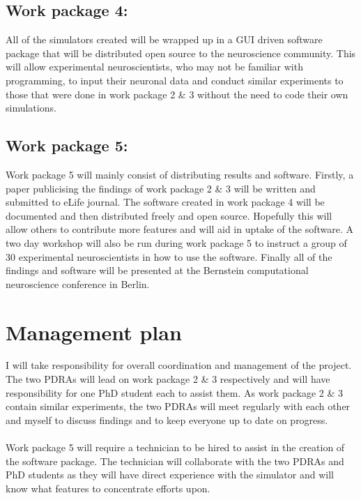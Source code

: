 \documentclass{epsrc}
\begin{document}
\subsection{Work package 4:}
\noindent	
All of the simulators created will be wrapped up in a GUI driven software package that will be distributed open source to the neuroscience community. This will allow experimental neuroscientists, who may not be familiar with programming, to input their neuronal data and conduct similar experiments to those that were done in work package 2 \& 3 without the need to code their own simulations.
\\
\subsection{Work package 5:}
\noindent
Work package 5 will mainly consist of distributing results and software. Firstly, a paper publicising the findings of work package 2 \& 3 will be written and submitted to eLife journal. The software created in work package 4 will be documented and then distributed freely and open source. Hopefully this will allow others to contribute more features and will aid in uptake of the software. A two day workshop will also be run during work package 5 to instruct a group of 30 experimental neuroscientists in how to use the software. Finally all of the findings and software will be presented at the Bernstein computational neuroscience conference in Berlin. 
\\
\section{Management plan}
\noindent
I will take responsibility for overall coordination and management of the project. The two PDRAs will lead on work package 2 \& 3 respectively and will have responsibility for one PhD student each to assist them. As work package 2 \& 3 contain similar experiments, the two PDRAs will meet regularly with each other and myself to discuss findings and to keep everyone up to date on progress.
\\\\
Work package 5 will require a technician to be hired to assist in the creation of the software package. The technician will collaborate with the two PDRAs and PhD students as they will have direct experience with the simulator and will know what features to concentrate efforts upon.
\end{document}
